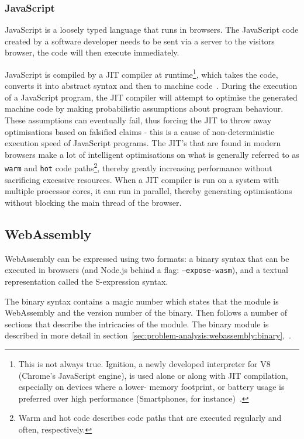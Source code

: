 \documentclass[a4paper]{article}
\begin{document}
\subsubsection{JavaScript}
JavaScript is a loosely typed language that runs in browsers. The JavaScript code created by a software developer needs to be sent via a server to the visitors browser, the code will then execute immediately.

JavaScript is compiled by a JIT compiler at runtime\footnote{This is not always true. Ignition, a newly developed interpreter for V8 (Chrome's JavaScript engine), is used alone or along with JIT compilation, especially on devices where a lower- memory footprint, or battery usage is preferred over high performance (Smartphones, for instance)~\cite{video:thompson-js-perf-v8-and-wasm}.}, which takes the code, converts it into abstract syntax and then to machine code~\cite[p.~13]{slides:lund-v8}. During the execution of a JavaScript program, the JIT compiler will attempt to optimise the generated machine code by making probabilistic assumptions about program behaviour. These assumptions can eventually fail, thus forcing the JIT to throw away optimisations based on falsified claims - this is a cause of non-deterministic execution speed of JavaScript programs. The JIT's that are found in modern browsers make a lot of intelligent optimisations on what is generally referred to as \texttt{warm} and \texttt{hot} code paths\footnote{Warm and hot code describes code paths that are executed regularly and often, respectively.}, thereby greatly increasing performance without sacrificing excessive resources. When a JIT compiler is run on a system with multiple processor cores, it can run in parallel, thereby generating optimisations without blocking the main thread of the browser.

\subsection{WebAssembly}
\label{sec:problem-analysis:webassembly}
WebAssembly can be expressed using two formats: a binary syntax that can be executed in browsers (and Node.js behind a flag: \texttt{--expose-wasm}), and a textual representation called the S-expression syntax.

The binary syntax contains a magic number which states that the module is WebAssembly and the version number of the binary. Then follows a number of sections that describe the intricacies of the module. The binary module is described in more detail in section~\ref{sec:problem-analysis:webassembly:binary},~.
\end{document}
